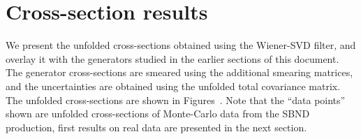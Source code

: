 \documentclass{article}
\begin{document}
\clearpage

\section{Cross-section results}

We present the unfolded cross-sections obtained using the Wiener-SVD filter, and overlay it with the generators 
studied in the earlier sections of this document. The generator cross-sections are smeared using the additional smearing matrices,
and the uncertainties are obtained using the unfolded total covariance matrix. The unfolded cross-sections are shown in
Figures~.
Note that the ``data points'' shown are unfolded cross-sections of Monte-Carlo data from the SBND production, first results on 
real data are presented in the next section.
\end{document}
